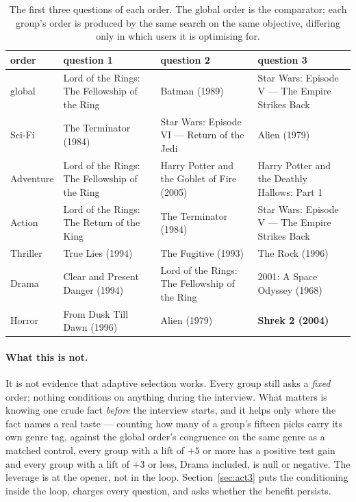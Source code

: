 \documentclass[11pt]{article}
\begin{document}
\begin{table}[t]
\centering
\caption{The first three questions of each order. The global order is the comparator; each group's
order is produced by the same search on the same objective, differing only in which users it is
optimising for.}
\label{tab:firstthree}
\footnotesize
\setlength{\tabcolsep}{4pt}
\begin{tabular}{p{1.6cm}p{3.4cm}p{3.4cm}p{3.6cm}}
\toprule
order & question 1 & question 2 & question 3 \\
\midrule
global & Lord of the Rings: The Fellowship of the Ring & Batman (1989) & Star Wars: Episode V --- The Empire Strikes Back \\
\addlinespace
Sci-Fi & The Terminator (1984) & Star Wars: Episode VI --- Return of the Jedi & Alien (1979) \\
Adventure & Lord of the Rings: The Fellowship of the Ring & Harry Potter and the Goblet of Fire (2005) & Harry Potter and the Deathly Hallows: Part 1 \\
Action & Lord of the Rings: The Return of the King & The Terminator (1984) & Star Wars: Episode V --- The Empire Strikes Back \\
Thriller & True Lies (1994) & The Fugitive (1993) & The Rock (1996) \\
\addlinespace
Drama & Clear and Present Danger (1994) & Lord of the Rings: The Fellowship of the Ring & 2001: A Space Odyssey (1968) \\
Horror & From Dusk Till Dawn (1996) & Alien (1979) & \textbf{Shrek 2 (2004)} \\
\bottomrule
\end{tabular}
\end{table}

\paragraph{What this is not.} It is not evidence that adaptive selection works. Every group still asks
a \emph{fixed} order; nothing conditions on anything during the interview. What matters is knowing one
crude fact \emph{before} the interview starts, and it helps only where the fact names a real taste ---
counting how many of a group's fifteen picks carry its own genre tag, against the global order's
congruence on the same genre as a matched control, every group with a lift of $+5$ or more has a
positive test gain and every group with a lift of $+3$ or less, Drama included, is null or negative.
The leverage is at the opener, not in the loop. Section~\ref{sec:act3} puts the conditioning inside
the loop, charges every question, and asks whether the benefit persists.
\end{document}

